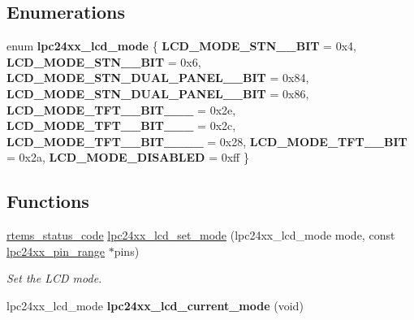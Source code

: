 \subsection*{Enumerations}
\begin{DoxyCompactItemize}
\item 
\mbox{\label{group__lpc__dma_ga638a818e4e4813d3fbf90371206e21fc}} 
enum {\bfseries lpc24xx\+\_\+lcd\+\_\+mode} \{ \newline
{\bfseries L\+C\+D\+\_\+\+M\+O\+D\+E\+\_\+\+S\+T\+N\+\_\+\_\+\+B\+IT} = 0x4, 
{\bfseries L\+C\+D\+\_\+\+M\+O\+D\+E\+\_\+\+S\+T\+N\+\_\+\_\+\+B\+IT} = 0x6, 
{\bfseries L\+C\+D\+\_\+\+M\+O\+D\+E\+\_\+\+S\+T\+N\+\_\+\+D\+U\+A\+L\+\_\+\+P\+A\+N\+E\+L\+\_\+\_\+\+B\+IT} = 0x84, 
{\bfseries L\+C\+D\+\_\+\+M\+O\+D\+E\+\_\+\+S\+T\+N\+\_\+\+D\+U\+A\+L\+\_\+\+P\+A\+N\+E\+L\+\_\+\_\+\+B\+IT} = 0x86, 
\newline
{\bfseries L\+C\+D\+\_\+\+M\+O\+D\+E\+\_\+\+T\+F\+T\+\_\+\_\+\+B\+I\+T\+\_\+\_\+\_} = 0x2e, 
{\bfseries L\+C\+D\+\_\+\+M\+O\+D\+E\+\_\+\+T\+F\+T\+\_\+\_\+\+B\+I\+T\+\_\+\_\+\_} = 0x2c, 
{\bfseries L\+C\+D\+\_\+\+M\+O\+D\+E\+\_\+\+T\+F\+T\+\_\+\_\+\+B\+I\+T\+\_\+\_\+\_\+\_} = 0x28, 
{\bfseries L\+C\+D\+\_\+\+M\+O\+D\+E\+\_\+\+T\+F\+T\+\_\+\_\+\+B\+IT} = 0x2a, 
\newline
{\bfseries L\+C\+D\+\_\+\+M\+O\+D\+E\+\_\+\+D\+I\+S\+A\+B\+L\+ED} = 0xff
 \}
\end{DoxyCompactItemize}
\subsection*{Functions}
\begin{DoxyCompactItemize}
\item 
\mbox{\hyperlink{group__ClassicStatus_ga545d41846817eaba6143d52ee4d9e9fe}{rtems\+\_\+status\+\_\+code}} \mbox{\hyperlink{group__lpc__dma_gae45d4f5831367f38cad384d75da01268}{lpc24xx\+\_\+lcd\+\_\+set\+\_\+mode}} (lpc24xx\+\_\+lcd\+\_\+mode mode, const \mbox{\hyperlink{unionlpc24xx__pin__range}{lpc24xx\+\_\+pin\+\_\+range}} $\ast$pins)
\begin{DoxyCompactList}\small\item\em Set the L\+CD {\itshape mode}. \end{DoxyCompactList}\item 
\mbox{\label{group__lpc__dma_ga824a9c4e01a81eaa07c0f874003fb821}} 
lpc24xx\+\_\+lcd\+\_\+mode {\bfseries lpc24xx\+\_\+lcd\+\_\+current\+\_\+mode} (void)
\end{DoxyCompactItemize}
